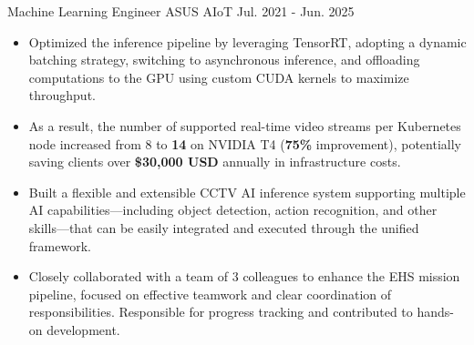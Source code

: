 

\begin{cventries}

\cventryexp
{Machine Learning Engineer} %
{ASUS AIoT} %
{Jul. 2021 - Jun. 2025} %
{
    \begin{cvitems} %
        \begin{itemize}
            \item Optimized the inference pipeline by leveraging TensorRT, adopting a 
            dynamic batching strategy, switching to asynchronous inference, and offloading 
            computations to the GPU using custom CUDA kernels to maximize throughput. 
            \item As a result, the number of supported real-time video streams per 
            Kubernetes node increased from 8 to \textbf{14} on NVIDIA T4 (\textbf{75\%} improvement), potentially 
            saving clients over \textbf{\$30,000 USD} annually in infrastructure costs.
        \end{itemize}
        \begin{itemize}
            \item Built a flexible and extensible CCTV AI inference system 
            supporting multiple AI capabilities—including object detection, 
            action recognition, and other skills—that can be easily integrated 
            and executed through the unified framework.
            \item Closely collaborated with a team of 3 colleagues to enhance the 
            EHS mission pipeline, focused on effective teamwork and clear coordination of 
            responsibilities. Responsible for progress tracking and contributed to hands-on 
            development.
        \end{itemize}
        \begin{itemize}

\end{itemize}
\end{cvitems}}
\end{cventries}
